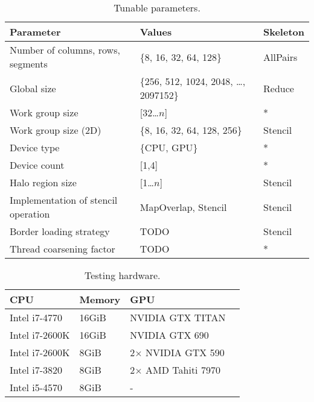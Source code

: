 \begin{table}
\footnotesize
\centering
\begin{tabular}{| l | l | l |}
\hline
\textbf{Parameter} & \textbf{Values} & \textbf{Skeleton}\\
\hline
Number of columns, rows, segments & \{8, 16, 32, 64, 128\} & AllPairs\\
Global size & \{256, 512, 1024, 2048, \ldots, 2097152\} & Reduce\\
Work group size & [32\ldots$n$] & *\\
Work group size (2D) & \{8, 16, 32, 64, 128, 256\} & Stencil\\
Device type & \{CPU, GPU\} & *\\
Device count & [1,4] & *\\
Halo region size & [1\ldots$n$] & Stencil\\
Implementation of stencil operation & {MapOverlap, Stencil} & Stencil\\
Border loading strategy & TODO & Stencil\\
Thread coarsening factor & TODO & *\\
\hline
\end{tabular}
\caption{Tunable parameters.}
\label{tab:knobs}
\end{table}

\begin{table}
\footnotesize
\centering
\begin{tabular}{| l | l | l | l |}
\hline
\textbf{CPU} & \textbf{Memory} & \textbf{GPU}\\
\hline
Intel i7-4770 & 16GiB & NVIDIA GTX TITAN\\
Intel i7-2600K & 16GiB & NVIDIA GTX 690\\
Intel i7-2600K & 8GiB & 2$\times$ NVIDIA GTX 590\\
Intel i7-3820 & 8GiB & 2$\times$ AMD Tahiti 7970\\
Intel i5-4570 & 8GiB & -\\
\hline
\end{tabular}
\caption{Testing hardware.}
\label{tab:hw}
\end{table}


\newpage

